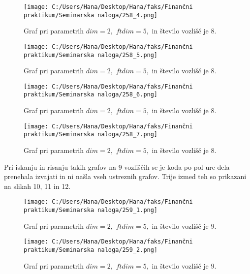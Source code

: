 \documentclass[12pt]{article}
\begin{document}
\begin{figure}[H]
    \centering
    \texttt{[image: C:/Users/Hana/Desktop/Hana/faks/Finančni praktikum/Seminarska naloga/258\_4.png]}
    \caption{Graf pri parametrih $dim = 2,$ $ftdim = 5,$ in število vozlišč je $8.$}
    \label{fig:slika258_4}
\end{figure}

\begin{figure}[H]
    \centering
    \texttt{[image: C:/Users/Hana/Desktop/Hana/faks/Finančni praktikum/Seminarska naloga/258\_5.png]}
    \caption{Graf pri parametrih $dim = 2,$ $ftdim = 5,$ in število vozlišč je $8.$}
    \label{fig:slika258_5}
\end{figure}

\begin{figure}[H]
    \centering
    \texttt{[image: C:/Users/Hana/Desktop/Hana/faks/Finančni praktikum/Seminarska naloga/258\_6.png]}
    \caption{Graf pri parametrih $dim = 2,$ $ftdim = 5,$ in število vozlišč je $8.$}
    \label{fig:slika258_6}
\end{figure}

\begin{figure}[H]
    \centering
    \texttt{[image: C:/Users/Hana/Desktop/Hana/faks/Finančni praktikum/Seminarska naloga/258\_7.png]}
    \caption{Graf pri parametrih $dim = 2,$ $ftdim = 5,$ in število vozlišč je $8.$}
    \label{fig:slika258_7}
\end{figure}

Pri iskanju in risanju takih grafov na 9 vozliščih se je koda po pol ure dela prenehala izvajati in ni našla vseh ustreznih 
grafov. Trije izmed teh so prikazani na slikah 10, 11 in 12.

\begin{figure}[H]
    \centering
    \texttt{[image: C:/Users/Hana/Desktop/Hana/faks/Finančni praktikum/Seminarska naloga/259\_1.png]}
    \caption{Graf pri parametrih $dim = 2,$ $ftdim = 5,$ in število vozlišč je $9.$}
    \label{fig:slika259_1}
\end{figure}

\begin{figure}[H]
    \centering
    \texttt{[image: C:/Users/Hana/Desktop/Hana/faks/Finančni praktikum/Seminarska naloga/259\_2.png]}
    \caption{Graf pri parametrih $dim = 2,$ $ftdim = 5,$ in število vozlišč je $9.$}
    \label{fig:slika259_2}
\end{figure}
\end{document}
